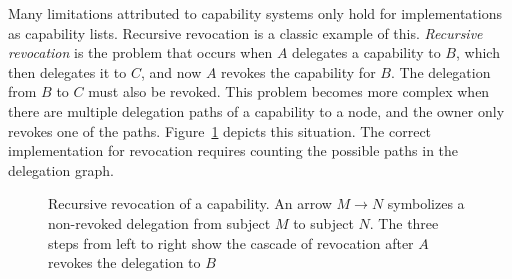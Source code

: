 Many limitations attributed to capability systems only hold for implementations as capability lists. Recursive revocation is a classic example of this. \emph{Recursive revocation} is the problem that occurs when $A$ delegates a capability to $B$, which then delegates it to $C$, and now $A$ revokes the capability for $B$. The delegation from $B$ to $C$ must also be revoked. This problem becomes more complex when there are multiple delegation paths of a capability to a node, and the owner only revokes one of the paths. Figure~\ref{fig:recursive-revocation} depicts this situation. The correct implementation for revocation requires counting the possible paths in the delegation graph.

\begin{figure}[H]
  \centering
  \caption{\label{fig:recursive-revocation} Recursive revocation of a capability. An arrow $M \to N$ symbolizes a non-revoked delegation from subject $M$ to subject $N$. The three steps from left to right show the cascade of revocation after $A$ revokes the delegation to $B$}
\end{figure}

